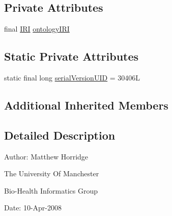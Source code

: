 \subsection*{Private Attributes}
\begin{DoxyCompactItemize}
\item 
final \hyperlink{classorg_1_1semanticweb_1_1owlapi_1_1model_1_1_i_r_i}{I\-R\-I} \hyperlink{classorg_1_1semanticweb_1_1owlapi_1_1io_1_1_ontology_i_r_i_mapping_not_found_exception_a92f0ecaca4878a3b3a4afc990f000dab}{ontology\-I\-R\-I}
\end{DoxyCompactItemize}
\subsection*{Static Private Attributes}
\begin{DoxyCompactItemize}
\item 
static final long \hyperlink{classorg_1_1semanticweb_1_1owlapi_1_1io_1_1_ontology_i_r_i_mapping_not_found_exception_abe3ab014827c1f54df52d8db8ee0b30b}{serial\-Version\-U\-I\-D} = 30406\-L
\end{DoxyCompactItemize}
\subsection*{Additional Inherited Members}


\subsection{Detailed Description}
Author\-: Matthew Horridge\par
 The University Of Manchester\par
 Bio-\/\-Health Informatics Group\par
 Date\-: 10-\/\-Apr-\/2008\par
\par
 

